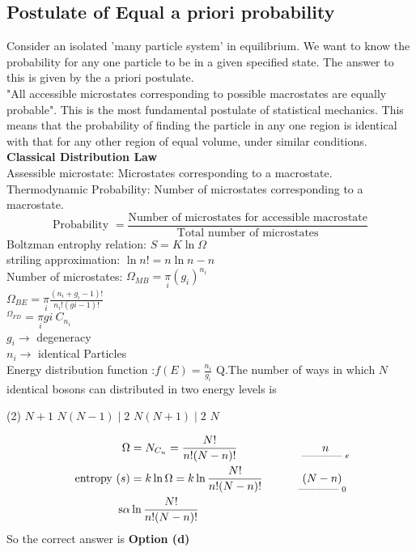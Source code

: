 \subsection{Postulate of Equal a priori probability}
Consider an isolated 'many particle system' in equilibrium. We want to know the probability for any one particle to be in a given specified state. The answer to this is given by the a priori postulate.\\
"All accessible microstates corresponding to possible macrostates are equally probable". This is the most fundamental postulate of statistical mechanics. This means that the probability of finding the particle in any one region is identical with that for any other region of equal volume, under similar conditions.\\
\textbf{ Classical Distribution Law }\\
Assessible microstate: Microstates corresponding to a macrostate.\\
Thermodynamic Probability: Number of microstates corresponding to a macrostate.\\
$$\text{Probability }=\frac{\text{Number of microstates for accessible macrostate}}{\text{Total number of microstates}}$$
Boltzman entrophy relation: $S=K \ln \Omega$\\
striling approximation: $\ln n !=n \ln n-n$\\
Number of microstates: 
$\Omega_{M B}=\underset{i}{\pi}\left(g_{i}\right)^{n_{i}}$\\
$\Omega_{B E}=\underset{i}{\pi}\frac{\left(n_{i}+g_{i}-1\right) !}{n_{i} !(g i-1) !}$\\
${ }^{\Omega_{F D}}=\underset{i}{\pi}{g i }\  C_{n_{i}}$\\
$g_{i} \rightarrow$ degeneracy\\
$n_{i} \rightarrow$ identical Particles\\
Energy distribution function :$f(E)=\frac{n_{i}}{g_{i}}$
Q.The number of ways in which $N$ identical bosons can distributed in two energy levels is 
 \begin{tasks}(2)
	\task[\textbf{a.}] $N+1$
	\task[\textbf{b.}]$N(N-1) \mid 2$
	\task[\textbf{c.}]$N(N+1) \mid 2$
	\task[\textbf{d.}]$N$ 
\end{tasks}
\begin{answer}
	\begin{align*}
	\Omega&=N_ {C_n}=\frac{N !}{n !(N-n) !}\hspace{2cm}\underset{\text{-------------- }e}{n}\\
	\text { entropy }(s)&=k \ln \Omega=k \ln \frac{N !}{n !(N-n) !}\hspace{1.1cm}\underset{\text{-------------- } 0}{(N-n)}\\
	\operatorname{s\alpha } &\ln \frac{N !}{n !(N-n) !}
	\end{align*}
		So the correct answer is \textbf{Option (d)}
\end{answer}
